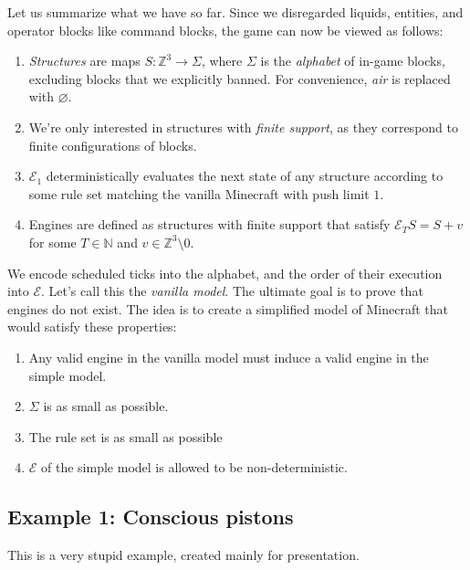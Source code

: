 \documentclass[12pt]{article}
\newcommand{\Z}{\mathbb{Z}}
\newcommand{\N}{\mathbb{N}}
\newcommand{\ev}{\mathcal{E}}
\theoremstyle{remark}
\theoremstyle{definition}
\begin{document}
Let us summarize what we have so far. Since we disregarded liquids, entities, and operator blocks like command blocks, the game can now be viewed as follows:
\begin{enumerate}
    \item \emph{Structures} are maps $S: \Z^3 \to \Sigma$, where $\Sigma$ is the \emph{alphabet} of in-game blocks, excluding blocks that we explicitly banned. For convenience, \emph{air} is replaced with $\varnothing$.
    \item We're only interested in structures with \emph{finite support}, as they correspond to finite configurations of blocks.
    \item $\ev_1$ deterministically evaluates the next state of any structure according to some rule set matching the vanilla Minecraft with push limit $1$.
    \item Engines are defined as structures with finite support that satisfy $\ev_T S=S+v$ for some $T\in\N$ and $v\in\Z^3\setminus0$.
\end{enumerate}
We encode scheduled ticks into the alphabet, and the order of their execution into $\ev$.
Let's call this the \emph{vanilla model}. The ultimate goal is to prove that engines do not exist. The idea is to create a simplified model of Minecraft that would satisfy these properties:
\begin{enumerate}
    \item Any valid engine in the vanilla model must induce a valid engine in the simple model.
    \item $\Sigma$ is as small as possible.
    \item The rule set is as small as possible
    \item $\ev$ of the simple model is allowed to be non-deterministic.
\end{enumerate}

\subsection{Example 1: Conscious pistons} \label{example:1}

This is a very stupid example, created mainly for presentation.
\end{document}
